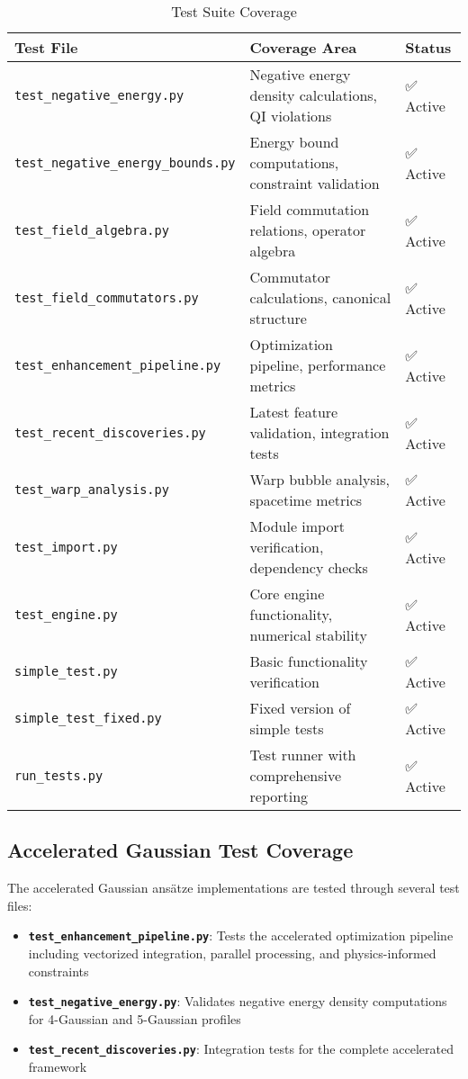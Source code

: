 \documentclass[12pt]{article}
\begin{document}
\begin{table}[ht]
\centering
\caption{Test Suite Coverage}
\label{tab:test_files}
\begin{tabular}{@{}p{4cm}p{6cm}p{2cm}@{}}
\toprule
\textbf{Test File} & \textbf{Coverage Area} & \textbf{Status} \\
\midrule
\texttt{test\_negative\_energy.py} & Negative energy density calculations, QI violations & ✅ Active \\
\texttt{test\_negative\_energy\_bounds.py} & Energy bound computations, constraint validation & ✅ Active \\
\texttt{test\_field\_algebra.py} & Field commutation relations, operator algebra & ✅ Active \\
\texttt{test\_field\_commutators.py} & Commutator calculations, canonical structure & ✅ Active \\
\texttt{test\_enhancement\_pipeline.py} & Optimization pipeline, performance metrics & ✅ Active \\
\texttt{test\_recent\_discoveries.py} & Latest feature validation, integration tests & ✅ Active \\
\texttt{test\_warp\_analysis.py} & Warp bubble analysis, spacetime metrics & ✅ Active \\
\texttt{test\_import.py} & Module import verification, dependency checks & ✅ Active \\
\texttt{test\_engine.py} & Core engine functionality, numerical stability & ✅ Active \\
\texttt{simple\_test.py} & Basic functionality verification & ✅ Active \\
\texttt{simple\_test\_fixed.py} & Fixed version of simple tests & ✅ Active \\
\texttt{run\_tests.py} & Test runner with comprehensive reporting & ✅ Active \\
\bottomrule
\end{tabular}
\end{table}

\subsection{Accelerated Gaussian Test Coverage}

The accelerated Gaussian ansätze implementations are tested through several test files:

\begin{itemize}
\item \textbf{\texttt{test\_enhancement\_pipeline.py}}: Tests the accelerated optimization pipeline including vectorized integration, parallel processing, and physics-informed constraints
\item \textbf{\texttt{test\_negative\_energy.py}}: Validates negative energy density computations for 4-Gaussian and 5-Gaussian profiles
\item \textbf{\texttt{test\_recent\_discoveries.py}}: Integration tests for the complete accelerated framework
\end{itemize}
\end{document}

